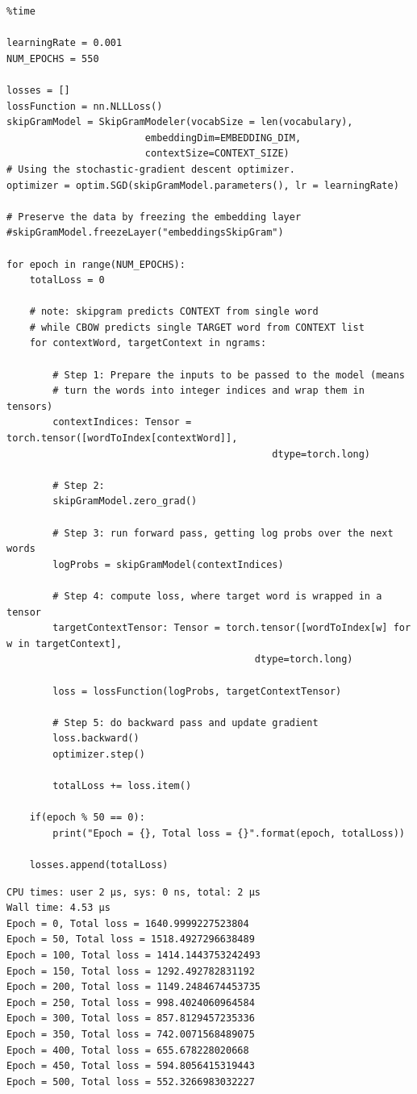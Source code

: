 \documentclass[
]{article}
\begin{document}
\begin{verbatim}
%time

learningRate = 0.001
NUM_EPOCHS = 550

losses = []
lossFunction = nn.NLLLoss()
skipGramModel = SkipGramModeler(vocabSize = len(vocabulary),
                        embeddingDim=EMBEDDING_DIM,
                        contextSize=CONTEXT_SIZE)
# Using the stochastic-gradient descent optimizer.
optimizer = optim.SGD(skipGramModel.parameters(), lr = learningRate)

# Preserve the data by freezing the embedding layer
#skipGramModel.freezeLayer("embeddingsSkipGram")

for epoch in range(NUM_EPOCHS):
    totalLoss = 0

    # note: skipgram predicts CONTEXT from single word
    # while CBOW predicts single TARGET word from CONTEXT list
    for contextWord, targetContext in ngrams:

        # Step 1: Prepare the inputs to be passed to the model (means
        # turn the words into integer indices and wrap them in tensors)
        contextIndices: Tensor = torch.tensor([wordToIndex[contextWord]],
                                              dtype=torch.long)

        # Step 2:
        skipGramModel.zero_grad()

        # Step 3: run forward pass, getting log probs over the next words
        logProbs = skipGramModel(contextIndices)

        # Step 4: compute loss, where target word is wrapped in a tensor
        targetContextTensor: Tensor = torch.tensor([wordToIndex[w] for w in targetContext],
                                           dtype=torch.long)

        loss = lossFunction(logProbs, targetContextTensor)

        # Step 5: do backward pass and update gradient
        loss.backward()
        optimizer.step()

        totalLoss += loss.item()

    if(epoch % 50 == 0):
        print("Epoch = {}, Total loss = {}".format(epoch, totalLoss))

    losses.append(totalLoss)
\end{verbatim}

\begin{verbatim}
CPU times: user 2 µs, sys: 0 ns, total: 2 µs
Wall time: 4.53 µs
Epoch = 0, Total loss = 1640.9999227523804
Epoch = 50, Total loss = 1518.4927296638489
Epoch = 100, Total loss = 1414.1443753242493
Epoch = 150, Total loss = 1292.492782831192
Epoch = 200, Total loss = 1149.2484674453735
Epoch = 250, Total loss = 998.4024060964584
Epoch = 300, Total loss = 857.8129457235336
Epoch = 350, Total loss = 742.0071568489075
Epoch = 400, Total loss = 655.678228020668
Epoch = 450, Total loss = 594.8056415319443
Epoch = 500, Total loss = 552.3266983032227
\end{verbatim}
\end{document}
